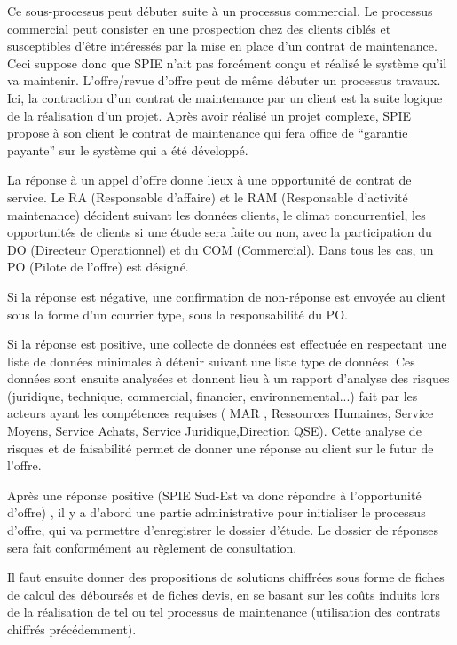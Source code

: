 Ce sous-processus peut débuter suite à un processus commercial. Le processus commercial peut consister en une prospection chez des clients ciblés et susceptibles d’être intéressés par la mise en place d’un contrat de maintenance. Ceci suppose donc que SPIE n’ait pas forcément conçu et réalisé le système qu’il va maintenir. L’offre/revue d’offre peut de même débuter  un processus travaux. Ici, la contraction d’un contrat de maintenance par un client est la suite logique de la réalisation d’un projet. Après avoir réalisé un projet complexe, SPIE propose à son client le contrat de maintenance qui fera office de “garantie payante” sur le système qui a été développé.

La réponse à un appel d’offre donne lieux à une opportunité de contrat de service. Le RA (Responsable d’affaire) et le RAM (Responsable d’activité maintenance) décident suivant les données clients, le climat concurrentiel, les opportunités de clients si une étude sera faite ou non, avec la participation du DO (Directeur Operationnel) et du COM (Commercial). Dans tous les cas, un PO (Pilote de l’offre) est désigné.

Si la réponse est négative, une confirmation de non-réponse est envoyée au client sous la forme d’un courrier type, sous la responsabilité du PO.

Si la réponse est positive, une collecte de données est effectuée en respectant une liste de données minimales à détenir suivant une liste type de données. Ces données sont ensuite analysées et donnent lieu à un rapport d’analyse des risques (juridique, technique, commercial, financier, environnemental...)  fait par les acteurs ayant les compétences requises ( MAR , Ressources Humaines, Service Moyens, Service Achats, Service Juridique,Direction QSE). Cette analyse de risques et de faisabilité permet de donner une réponse au client sur le futur de l’offre.

Après une réponse positive (SPIE Sud-Est va donc répondre à l’opportunité d’offre) , il y a d’abord une partie administrative pour initialiser le processus d’offre, qui va permettre d’enregistrer le dossier d’étude. Le dossier de réponses sera fait conformément au règlement de consultation.

Il faut ensuite donner des propositions de solutions chiffrées sous forme de fiches de calcul des déboursés et de fiches devis, en se basant sur les coûts induits lors de la réalisation de tel ou tel processus de maintenance (utilisation des contrats chiffrés précédemment).

